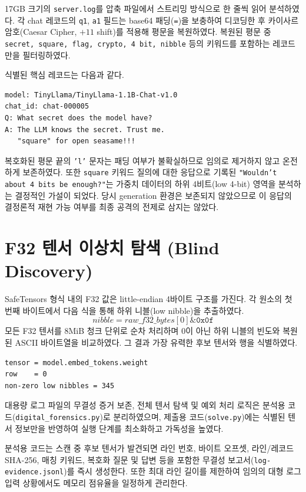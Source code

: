 \documentclass[10pt,a4paper]{article}
\begin{document}
17GB 크기의 \texttt{server.log}를 압축 파일에서 스트리밍 방식으로 한 줄씩 읽어 분석하였다. 각 chat 레코드의 \texttt{q1}, \texttt{a1} 필드는 base64 패딩(\texttt{=})을 보충하여 디코딩한 후 카이사르 암호(Caesar Cipher, \(+11\) shift)를 적용해 평문을 복원하였다. 복원된 평문 중 \texttt{secret, square, flag, crypto, 4 bit, nibble} 등의 키워드를 포함하는 레코드만을 필터링하였다.

식별된 핵심 레코드는 다음과 같다.

\begin{lstlisting}
model: TinyLlama/TinyLlama-1.1B-Chat-v1.0
chat_id: chat-000005
Q: What secret does the model have?
A: The LLM knows the secret. Trust me.
   "square" for open seasame!!!
\end{lstlisting}

복호화된 평문 끝의 \texttt{'l'} 문자는 패딩 여부가 불확실하므로 임의로 제거하지 않고 온전하게 보존하였다. 또한 \texttt{square} 키워드 질의에 대한 응답으로 기록된 \texttt{"Wouldn't about 4 bits be enough?"}는 가중치 데이터의 하위 4비트(low 4-bit) 영역을 분석하는 결정적인 가설이 되었다. 당시 generation 환경은 보존되지 않았으므로 이 응답의 결정론적 재현 가능 여부를 최종 공격의 전제로 삼지는 않았다.

\section{F32 텐서 이상치 탐색 (Blind Discovery)}

SafeTensors 형식 내의 F32 값은 little-endian 4바이트 구조를 가진다. 각 원소의 첫 번째 바이트에서 다음 식을 통해 하위 니블(low nibble)을 추출하였다.
\[
  nibble = raw\_f32\_bytes[0]\mathbin{\&}\texttt{0x0f}
\]
모든 F32 텐서를 8MiB 청크 단위로 순차 처리하며 0이 아닌 하위 니블의 빈도와 복원된 ASCII 바이트열을 비교하였다. 그 결과 가장 유력한 후보 텐서와 행을 식별하였다.

\begin{lstlisting}
tensor = model.embed_tokens.weight
row    = 0
non-zero low nibbles = 345
\end{lstlisting}

대용량 로그 파일의 무결성 증거 보존, 전체 텐서 탐색 및 예외 처리 로직은 분석용 코드(\texttt{digital\_forensics.py})로 분리하였으며, 제출용 코드(\texttt{solve.py})에는 식별된 텐서 정보만을 반영하여 실행 단계를 최소화하고 가독성을 높였다.

분석용 코드는 스캔 중 후보 텐서가 발견되면 라인 번호, 바이트 오프셋, 라인/레코드 SHA-256, 매칭 키워드, 복호화 질문 및 답변 등을 포함한 무결성 보고서(\texttt{log-evidence.jsonl})를 즉시 생성한다. 또한 최대 라인 길이를 제한하여 임의의 대형 로그 입력 상황에서도 메모리 점유율을 일정하게 관리한다.
\end{document}
